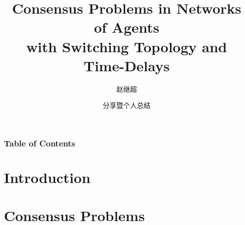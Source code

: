 \documentclass{beamer}
\title[Top/Down] %
{Consensus Problems in Networks of Agents\\ with Switching Topology and Time-Delays}
\author[JC] %
{赵继超}
\date[\today] %
{分享暨个人总结}
\begin{document}
\frame{\titlepage}


\begin{frame}
\frametitle{Table of Contents}
\tableofcontents
\end{frame}


\section{Introduction}








\section{Consensus Problems}
\end{document}
